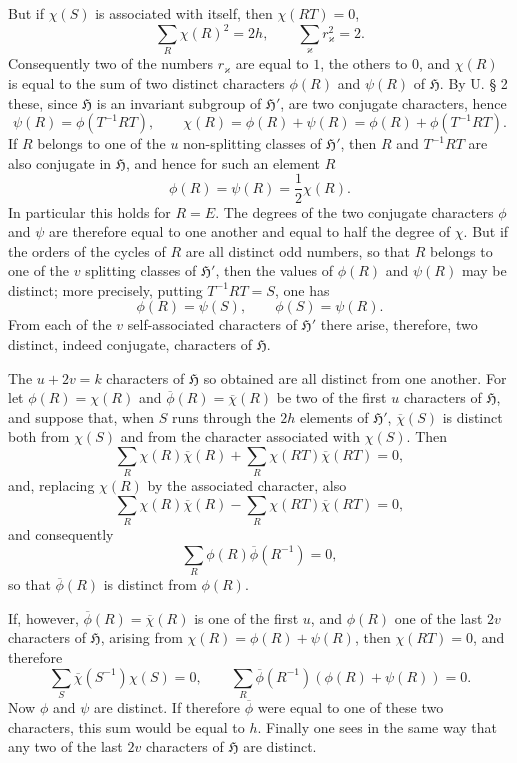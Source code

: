\documentclass[11pt]{article}
\newcommand{\Hgr}{\mathfrak{H}}
\begin{document}
But if $\chi(S)$ is associated with itself, then $\chi(RT)=0$,
\[
 \sum_R \chi(R)^2=2h,	\qquad \sum_\varkappa r_\varkappa^2=2.
\]
Consequently two of the numbers $r_\varkappa$ are equal to $1$, the others to $0$, and $\chi(R)$ is equal to the sum of two distinct characters $\phi(R)$ and $\psi(R)$ of $\Hgr$. By U. § 2 these, since $\Hgr$ is an invariant subgroup of $\Hgr'$, are two conjugate characters, hence
\begin{equation}\tag{2.}
 \psi(R)=\phi(T^{-1}RT),\qquad \chi(R)=\phi(R)+\psi(R)=\phi(R)+\phi(T^{-1}RT).
\end{equation}
If $R$ belongs to one of the $u$ non-splitting classes of $\Hgr'$, then $R$ and $T^{-1}RT$ are also conjugate in $\Hgr$, and hence for such an element $R$
\begin{equation}\tag{u.}
 \phi(R)=\psi(R)=\frac12\chi(R).
\end{equation}
In particular this holds for $R=E$. The degrees of the two conjugate characters $\phi$ and $\psi$ are therefore equal to one another and equal to half the degree of $\chi$. But if the orders of the cycles of $R$ are all distinct odd numbers, so that $R$ belongs to one of the $v$ splitting classes of $\Hgr'$, then the values of $\phi(R)$ and $\psi(R)$ may be distinct; more precisely, putting $T^{-1}RT=S$, one has
\begin{equation}\tag{v.}
 \phi(R)=\psi(S),	\qquad \phi(S)=\psi(R).
\end{equation}
From each of the $v$ self-associated characters of $\Hgr'$ there arise, therefore, two distinct, indeed conjugate, characters of $\Hgr$.

The $u+2v=k$ characters of $\Hgr$ so obtained are all distinct from one another. For let $\phi(R)=\chi(R)$ and $\overline{\phi}(R)=\overline{\chi}(R)$ be two of the first $u$ characters of $\Hgr$, and suppose that, when $S$ runs through the $2h$ elements of $\Hgr'$, $\overline{\chi}(S)$ is distinct both from $\chi(S)$ and from the character associated with $\chi(S)$. Then
\[
 \sum_R \chi(R)\overline{\chi}(R)+\sum_R \chi(RT)\overline{\chi}(RT)=0,
\]
and, replacing $\chi(R)$ by the associated character, also
\[
 \sum_R \chi(R)\overline{\chi}(R)-\sum_R\chi(RT)\overline{\chi}(RT)=0,
\]
and consequently
\[
 \sum_R \phi(R)\overline{\phi}(R^{-1})=0,
\]
so that $\overline{\phi}(R)$ is distinct from $\phi(R)$.

If, however, $\overline{\phi}(R)=\overline{\chi}(R)$ is one of the first $u$, and $\phi(R)$ one of the last $2v$ characters of $\Hgr$, arising from $\chi(R)=\phi(R)+\psi(R)$, then $\chi(RT)=0$, and therefore
\[
 \sum_S \overline{\chi}(S^{-1})\chi(S)=0,	\qquad \sum_R\overline{\phi}(R^{-1})(\phi(R)+\psi(R))=0.
\]
Now $\phi$ and $\psi$ are distinct. If therefore $\overline{\phi}$ were equal to one of these two characters, this sum would be equal to $h$. Finally one sees in the same way that any two of the last $2v$ characters of $\Hgr$ are distinct.
\end{document}

